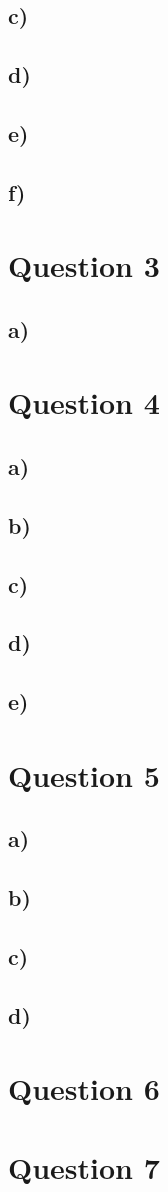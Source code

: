 \documentclass{article}
\begin{document}
\subsection*{c)}
\subsection*{d)}
\subsection*{e)}
\subsection*{f)}

\clearpage
\section*{Question 3}
\subsection*{a)}

\clearpage
\section*{Question 4}
\subsection*{a)}
\subsection*{b)}
\subsection*{c)}
\subsection*{d)}
\subsection*{e)}

\clearpage
\section*{Question 5}
\subsection*{a)}
\subsection*{b)}
\subsection*{c)}
\subsection*{d)}

\clearpage
\section*{Question 6}

\clearpage
\section*{Question 7}
\end{document}
